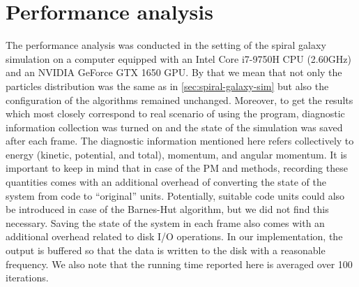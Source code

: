 \section{Performance analysis}
The performance analysis was conducted in the setting of the spiral galaxy simulation on a computer equipped with an Intel Core i7-9750H CPU (2.60GHz) and an NVIDIA GeForce GTX 1650 GPU.
By that we mean that not only the particles distribution was the same as in \autoref{sec:spiral-galaxy-sim} but also the configuration of the algorithms remained unchanged.
Moreover, to get the results which most closely correspond to real scenario of using the program, diagnostic information collection was turned on and the state of the simulation was saved after each frame.
The diagnostic information mentioned here refers collectively to energy (kinetic, potential, and total), momentum, and angular momentum.
It is important to keep in mind that in case of the PM and \PThreeM{} methods, recording these quantities comes with an additional overhead of converting the state of the system from code to ``original'' units.
Potentially, suitable code units could also be introduced in case of the Barnes-Hut algorithm, but we did not find this necessary.
Saving the state of the system in each frame also comes with an additional overhead related to disk I/O operations.
In our implementation, the output is buffered so that the data is written to the disk with a reasonable frequency.
We also note that the running time reported here is averaged over 100 iterations.

